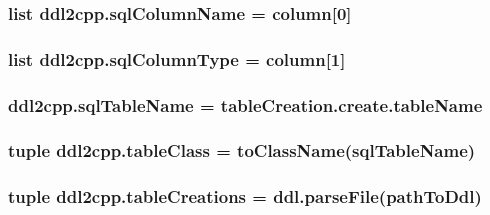 \subsubsection[{sql\+Column\+Name}]{\setlength{\rightskip}{0pt plus 5cm}list ddl2cpp.\+sql\+Column\+Name = column\mbox{[}0\mbox{]}}\label{namespaceddl2cpp_a4172a520f4c7f16bb27ba4cdc3a440e6}
\hypertarget{namespaceddl2cpp_ae949d2e11a19fd77dcbdc26edd72cf53}{}
\subsubsection[{sql\+Column\+Type}]{\setlength{\rightskip}{0pt plus 5cm}list ddl2cpp.\+sql\+Column\+Type = column\mbox{[}1\mbox{]}}\label{namespaceddl2cpp_ae949d2e11a19fd77dcbdc26edd72cf53}
\hypertarget{namespaceddl2cpp_ab7475b2e13b9191674fa194059e34fd3}{}
\subsubsection[{sql\+Table\+Name}]{\setlength{\rightskip}{0pt plus 5cm}ddl2cpp.\+sql\+Table\+Name = table\+Creation.\+create.\+table\+Name}\label{namespaceddl2cpp_ab7475b2e13b9191674fa194059e34fd3}
\hypertarget{namespaceddl2cpp_a02f88bd22a70bc696974c61fb718a231}{}
\subsubsection[{table\+Class}]{\setlength{\rightskip}{0pt plus 5cm}tuple ddl2cpp.\+table\+Class = {\bf to\+Class\+Name}({\bf sql\+Table\+Name})}\label{namespaceddl2cpp_a02f88bd22a70bc696974c61fb718a231}
\hypertarget{namespaceddl2cpp_a776ec4c34c9e0a9657d5bf69b48d7af8}{}
\subsubsection[{table\+Creations}]{\setlength{\rightskip}{0pt plus 5cm}tuple ddl2cpp.\+table\+Creations = ddl.\+parse\+File({\bf path\+To\+Ddl})}\label{namespaceddl2cpp_a776ec4c34c9e0a9657d5bf69b48d7af8}
\hypertarget{namespaceddl2cpp_af01677d026a7e6ca36b20121ad0a3c80}{}
